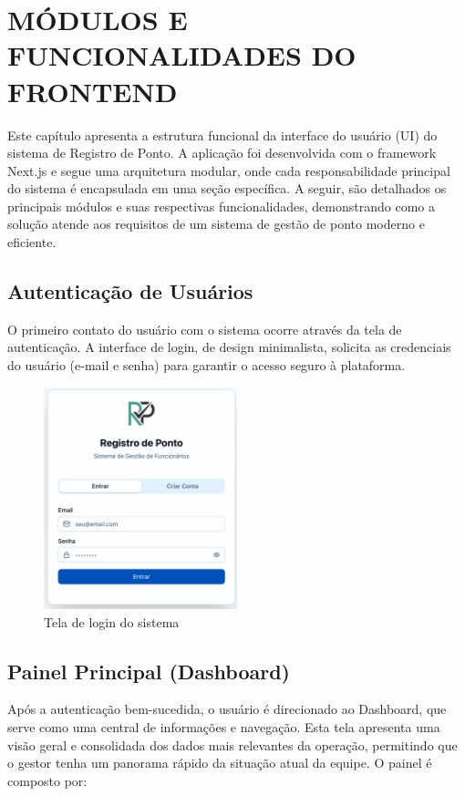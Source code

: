 \chapter{MÓDULOS E FUNCIONALIDADES DO FRONTEND}

Este capítulo apresenta a estrutura funcional da interface do usuário (UI) do sistema de Registro de Ponto. A aplicação foi desenvolvida com o framework Next.js e segue uma arquitetura modular, onde cada responsabilidade principal do sistema é encapsulada em uma seção específica. A seguir, são detalhados os principais módulos e suas respectivas funcionalidades, demonstrando como a solução atende aos requisitos de um sistema de gestão de ponto moderno e eficiente.

\section{Autenticação de Usuários}

O primeiro contato do usuário com o sistema ocorre através da tela de autenticação. A interface de login, de design minimalista, solicita as credenciais do usuário (e-mail e senha) para garantir o acesso seguro à plataforma.

\begin{figure}[H]
\centering
\includegraphics[width=0.5\textwidth]{imagens/tela-login.png}
\caption{Tela de login do sistema}
\label{fig:tela-login}
\end{figure}

\section{Painel Principal (Dashboard)}

Após a autenticação bem-sucedida, o usuário é direcionado ao Dashboard, que serve como uma central de informações e navegação. Esta tela apresenta uma visão geral e consolidada dos dados mais relevantes da operação, permitindo que o gestor tenha um panorama rápido da situação atual da equipe. O painel é composto por:

